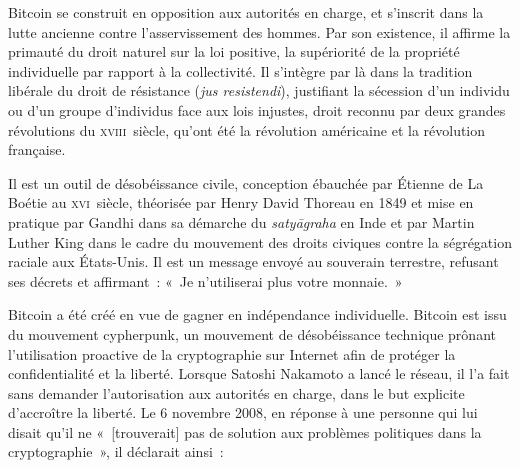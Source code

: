 Bitcoin se construit en opposition aux autorités en charge, et s'inscrit dans la lutte ancienne contre l'asservissement des hommes. Par son existence, il affirme la primauté du droit naturel sur la loi positive, la supériorité de la propriété individuelle par rapport à la collectivité. Il s'intègre par là dans la tradition libérale du droit de résistance (\emph{jus resistendi}), justifiant la sécession d'un individu ou d'un groupe d'individus face aux lois injustes, droit reconnu par deux grandes révolutions du \textsc{xviii}\ieme{}~siècle, qu'ont été la révolution américaine et la révolution française.

Il est un outil de désobéissance civile, conception ébauchée par Étienne de La Boétie au \textsc{xvi}\ieme{}~siècle, théorisée par Henry David Thoreau en 1849 et mise en pratique par Gandhi dans sa démarche du \emph{satyāgraha} en Inde et par Martin Luther King dans le cadre du mouvement des droits civiques contre la ségrégation raciale aux États-Unis. Il est un message envoyé au souverain terrestre, refusant ses décrets et affirmant~: «~Je n'utiliserai plus votre monnaie.~»


Bitcoin a été créé en vue de gagner en indépendance individuelle. Bitcoin est issu du mouvement cypherpunk, un mouvement de désobéissance technique prônant l'utilisation proactive de la cryptographie sur Internet afin de protéger la confidentialité et la liberté. Lorsque Satoshi Nakamoto a lancé le réseau, il l'a fait sans demander l'autorisation aux autorités en charge, dans le but explicite d'accroître la liberté. Le 6 novembre 2008, en réponse à une personne qui lui disait qu'il ne «~[trouverait] pas de solution aux problèmes politiques dans la cryptographie~», il déclarait ainsi~:

